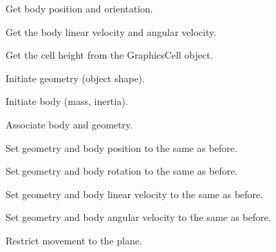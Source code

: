 \begin{DoxyItemize}
\item \-Get body position and orientation.
\end{DoxyItemize}


\begin{DoxyItemize}
\item \-Get the body linear velocity and angular velocity.
\end{DoxyItemize}


\begin{DoxyItemize}
\item \-Get the cell height from the \-Graphics\-Cell object.
\end{DoxyItemize}


\begin{DoxyItemize}
\item \-Initiate geometry (object shape).
\end{DoxyItemize}


\begin{DoxyItemize}
\item \-Initiate body (mass, inertia).
\end{DoxyItemize}


\begin{DoxyItemize}
\item \-Associate body and geometry.
\end{DoxyItemize}


\begin{DoxyItemize}
\item \-Set geometry and body position to the same as before.
\end{DoxyItemize}


\begin{DoxyItemize}
\item \-Set geometry and body rotation to the same as before.
\end{DoxyItemize}


\begin{DoxyItemize}
\item \-Set geometry and body linear velocity to the same as before.
\end{DoxyItemize}


\begin{DoxyItemize}
\item \-Set geometry and body angular velocity to the same as before.
\end{DoxyItemize}


\begin{DoxyItemize}
\item \-Restrict movement to the plane. 
\end{DoxyItemize}

